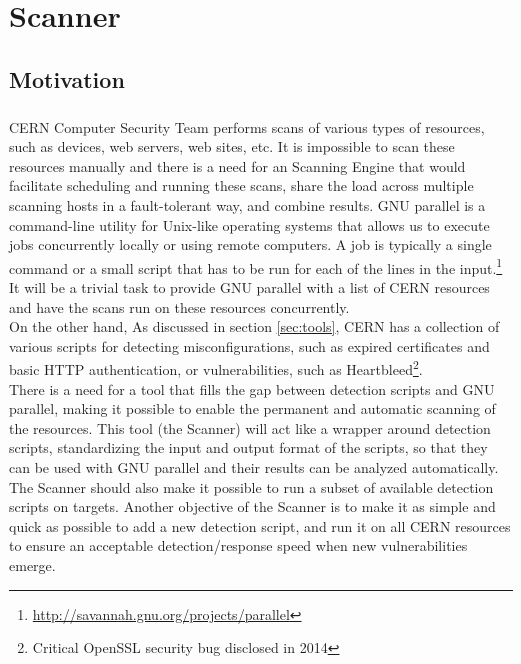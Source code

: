 \chapter{Scanner}
\label{scanner}
\thispagestyle{empty}

\section{Motivation}
\label{scanner_motivation}
\paragraph{}

CERN Computer Security Team performs scans of various types of resources, such as devices, web servers, web sites, etc. It is impossible to scan these resources manually and there is a need for an Scanning Engine that would facilitate scheduling and running these scans, share the load across multiple scanning hosts in a fault-tolerant way, and combine results.
GNU parallel is a command-line utility for Unix-like operating systems that allows us to execute jobs concurrently locally or using remote computers. A job is typically a single command or a small script that has to be run for each of the lines in the input.\footnote{\url{http://savannah.gnu.org/projects/parallel}} It will be a trivial task to provide GNU parallel with a list of CERN resources and have the scans run on these resources concurrently.
\\ 
On the other hand, As discussed in section \ref{sec:tools}, CERN has a collection of various scripts for detecting misconfigurations, such as expired certificates and basic HTTP authentication, or vulnerabilities, such as Heartbleed\footnote{Critical OpenSSL security bug disclosed in 2014}. 
\\
There is a need for a tool that fills the gap between detection scripts and GNU parallel, making it possible to enable the permanent and automatic scanning of the resources. This tool (the Scanner) will act like a wrapper around detection scripts, standardizing the input and output format of the scripts, so that they can be used with GNU parallel and their results can be analyzed automatically. The Scanner should also make it possible to run a subset of available detection scripts on targets. Another objective of the Scanner is to make it as simple and quick as possible to add a new detection script, and run it on all CERN resources to ensure an acceptable detection/response speed when new vulnerabilities emerge.


